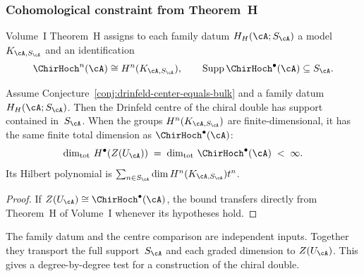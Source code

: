 \subsubsection{Cohomological constraint from Theorem~H}

Volume~I Theorem~H assigns to each family datum $H_H(\cA;S_\cA)$ a
model $K_{\cA,S_\cA}$ and an identification
\[
 \ChirHoch^n(\cA)\cong H^n(K_{\cA,S_\cA}),
 \qquad
 \operatorname{Supp}\ChirHoch^\bullet(\cA)\subseteq S_\cA.
\]

\begin{corollary}
\label{conj:drinfeld-center-amplitude}
Assume Conjecture~\textup{\ref{conj:drinfeld-center-equals-bulk}} and
a family datum $H_H(\cA;S_\cA)$.  Then the Drinfeld centre of the
chiral double has support contained in~$S_\cA$.  When the groups
$H^n(K_{\cA,S_\cA})$ are finite-dimensional, it has the same finite
total dimension as
$\ChirHoch^\bullet(\cA)$:
\begin{equation}
\dim_{\mathrm{tot}}\, H^\bullet(Z(U_\cA))
\;=\; \dim_{\mathrm{tot}}\, \ChirHoch^\bullet(\cA)
\;<\; \infty.
\end{equation}
Its Hilbert polynomial is
$\sum_{n\in S_\cA}\dim H^n(K_{\cA,S_\cA})t^n$.
\end{corollary}

\begin{proof}
If $Z(U_\cA) \cong \ChirHoch^\bullet(\cA)$, the bound transfers
directly from Theorem~H of Volume~I whenever its hypotheses hold.
\end{proof}

\begin{remark}
\label{rem:drinfeld-center-amplitude-constraint}
The family datum and the centre comparison are independent inputs.
Together they transport the full support~$S_\cA$ and each graded
dimension to $Z(U_\cA)$.  This gives a degree-by-degree test for a
construction of the chiral double.
\end{remark}

